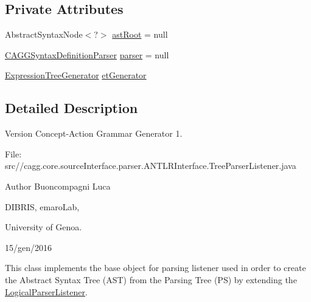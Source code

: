 \subsection*{Private Attributes}
\begin{DoxyCompactItemize}
\item 
Abstract\-Syntax\-Node$<$?$>$ \hyperlink{classit_1_1emarolab_1_1cagg_1_1core_1_1language_1_1parser_1_1ANTLRInterface_1_1TreeParserListener_ad21c3a5295c708707d5d40758bf3cb47}{ast\-Root} = null
\item 
\hyperlink{classit_1_1emarolab_1_1cagg_1_1core_1_1language_1_1parser_1_1ANTLRInterface_1_1ANTLRGenerated_1_1CAGGSyntaxDefinitionParser}{C\-A\-G\-G\-Syntax\-Definition\-Parser} \hyperlink{classit_1_1emarolab_1_1cagg_1_1core_1_1language_1_1parser_1_1ANTLRInterface_1_1TreeParserListener_a81b2e5e2d506fb0384e95edadf4a844c}{parser} = null
\item 
\hyperlink{classit_1_1emarolab_1_1cagg_1_1core_1_1language_1_1syntax_1_1expressionTree_1_1ExpressionTreeGenerator}{Expression\-Tree\-Generator} \hyperlink{classit_1_1emarolab_1_1cagg_1_1core_1_1language_1_1parser_1_1ANTLRInterface_1_1TreeParserListener_a70e1c2776e82386a35ccd34ade6071ff}{et\-Generator}
\end{DoxyCompactItemize}


\subsection{Detailed Description}
\begin{DoxyVersion}{Version}
Concept-\/\-Action Grammar Generator 1. \par
 File\-: src//cagg.core.\-source\-Interface.\-parser.\-A\-N\-T\-L\-R\-Interface.\-Tree\-Parser\-Listener.\-java \par

\end{DoxyVersion}
\begin{DoxyAuthor}{Author}
Buoncompagni Luca \par
 D\-I\-B\-R\-I\-S, emaro\-Lab,\par
 University of Genoa. \par
 15/gen/2016 \par

\end{DoxyAuthor}


This class implements the base object for parsing listener used in order to create the Abstract Syntax Tree (A\-S\-T) from the Parsing Tree (P\-S) by extending the \hyperlink{classit_1_1emarolab_1_1cagg_1_1core_1_1language_1_1parser_1_1ANTLRInterface_1_1LogicalParserListener}{Logical\-Parser\-Listener}.\par


